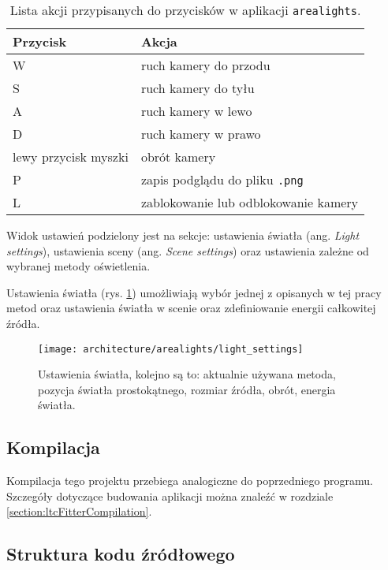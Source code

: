 \documentclass[../main.tex]{subfiles}
\begin{document}
\begin{table}[h]
    \centering
    \begin{tabular}{|l|l|}
        \hline \textbf{Przycisk} & \textbf{Akcja} \\ \hline
        W & ruch kamery do przodu \\ \hline
        S & ruch kamery do tyłu \\ \hline
        A & ruch kamery w lewo \\ \hline
        D & ruch kamery w prawo \\ \hline
        lewy przycisk myszki & obrót kamery \\ \hline
        P & zapis podglądu do pliku \texttt{.png} \\ \hline
        L & zablokowanie lub odblokowanie kamery \\ \hline
    \end{tabular}
    
    \caption{Lista akcji przypisanych do przycisków w aplikacji \texttt{arealights}.}
    \label{tab:arealights_keybindings}
\end{table}

Widok ustawień podzielony jest na sekcje: ustawienia światła (ang. \textit{Light settings}), ustawienia sceny (ang. \textit{Scene settings}) oraz ustawienia zależne od wybranej metody oświetlenia.

Ustawienia światła (rys. \ref{fig:app_arealights_light_settings}) umożliwiają wybór jednej z opisanych w tej pracy metod oraz ustawienia światła w scenie oraz zdefiniowanie energii całkowitej źródła.

\begin{figure}[h]
    \centering
    \texttt{[image: architecture/arealights/light\_settings]}
    \caption{Ustawienia światła, kolejno są to: aktualnie używana metoda, pozycja światła prostokątnego, rozmiar źródła, obrót, energia światła.}
    \label{fig:app_arealights_light_settings}
\end{figure}

\subsection{Kompilacja}

Kompilacja tego projektu przebiega analogiczne do poprzedniego programu. Szczegóły dotyczące budowania aplikacji można znaleźć w rozdziale \ref{section:ltcFitterCompilation}.

\subsection{Struktura kodu źródłowego}
\end{document}
